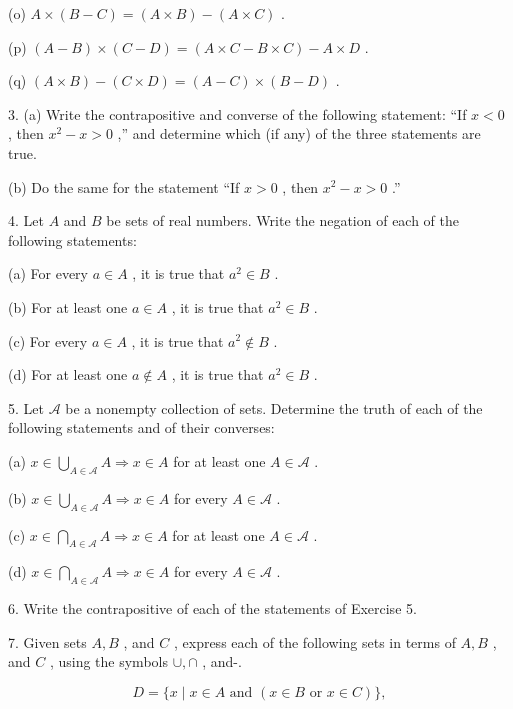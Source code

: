(o) \(A \times  \left( {B - C}\right)  = \left( {A \times  B}\right)  - \left( {A \times  C}\right)\) .

(p) \(\left( {A - B}\right)  \times  \left( {C - D}\right)  = \left( {A \times  C - B \times  C}\right)  - A \times  D\) .

(q) \(\left( {A \times  B}\right)  - \left( {C \times  D}\right)  = \left( {A - C}\right)  \times  \left( {B - D}\right)\) .

3. (a) Write the contrapositive and converse of the following statement: “If \(x < 0\) , then \({x}^{2} - x > 0\) ,'' and determine which (if any) of the three statements are true.

(b) Do the same for the statement ``If \(x > 0\) , then \({x}^{2} - x > 0\) .''

4. Let \(A\) and \(B\) be sets of real numbers. Write the negation of each of the following statements:

(a) For every \(a \in  A\) , it is true that \({a}^{2} \in  B\) .

(b) For at least one \(a \in  A\) , it is true that \({a}^{2} \in  B\) .

(c) For every \(a \in  A\) , it is true that \({a}^{2} \notin  B\) .

(d) For at least one \(a \notin  A\) , it is true that \({a}^{2} \in  B\) .

5. Let \(\mathcal{A}\) be a nonempty collection of sets. Determine the truth of each of the following statements and of their converses:

(a) \(x \in  \mathop{\bigcup }\limits_{{A \in  \mathcal{A}}}A \Rightarrow  x \in  A\) for at least one \(A \in  \mathcal{A}\) .

(b) \(x \in  \mathop{\bigcup }\limits_{{A \in  \mathcal{A}}}A \Rightarrow  x \in  A\) for every \(A \in  \mathcal{A}\) .

(c) \(x \in  \mathop{\bigcap }\limits_{{A \in  \mathcal{A}}}A \Rightarrow  x \in  A\) for at least one \(A \in  \mathcal{A}\) .

(d) \(x \in  \mathop{\bigcap }\limits_{{A \in  \mathcal{A}}}A \Rightarrow  x \in  A\) for every \(A \in  \mathcal{A}\) .

6. Write the contrapositive of each of the statements of Exercise 5.

7. Given sets \(A,B\) , and \(C\) , express each of the following sets in terms of \(A,B\) , and \(C\) , using the symbols \(\cup  , \cap\) , and-.

\[
D = \{ x \mid  x \in  A\text{ and }\left( {x \in  B\text{ or }x \in  C}\right) \} ,
\]


